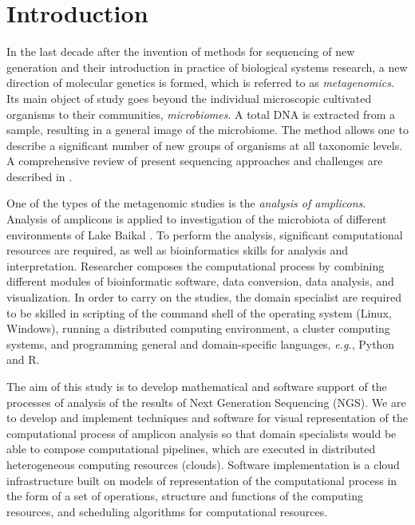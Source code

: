 \documentclass[a4paper]{jpconf}
\begin{document}

\section{Introduction}


In the last decade after the invention of methods for sequencing of new generation and their introduction in practice of biological systems research, a new direction of molecular genetics is formed, which is referred to as \emph{metagenomics}. Its main object of study goes beyond the individual microscopic cultivated organisms to their communities, \emph{microbiomes}. A total DNA is extracted from a sample, resulting in a general image of the microbiome. The method allows one to describe a significant number of new groups of organisms at all taxonomic levels. A comprehensive review of present sequencing approaches and challenges are described in \cite{pere20}.

One of the types of the metagenomic studies is the \emph{analysis of amplicons}. Analysis of amplicons is applied to investigation of the microbiota of different environments of Lake Baikal \cite{underice}. To perform the analysis, significant computational resources are required, as well as bioinformatics skills for analysis and interpretation. Researcher composes the computational process by combining different modules of bioinformatic software, data conversion, data analysis, and visualization. In order to carry on the studies, the domain specialist are required to be skilled in scripting of the command shell of the operating system (Linux, Windows), running a distributed computing environment, a cluster computing systems, and programming general and domain-specific languages, \emph{e.g.}, Python and R.

The aim of this study is to develop mathematical and software support of the processes of analysis of the results of Next Generation Sequencing (NGS). We are to develop and implement techniques and software for visual representation of the computational process of amplicon analysis so that domain specialists would be able to compose computational pipelines, which are executed in distributed heterogeneous computing resources (clouds). Software implementation is a cloud infrastructure built on models of representation of the computational process in the form of a set of operations, structure and functions of the computing resources, and scheduling algorithms for computational resources.
\end{document}
